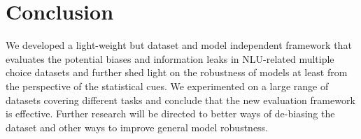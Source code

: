 \section{Conclusion}
We developed a light-weight but dataset and model independent framework that evaluates the
potential biases and information leaks in NLU-related multiple choice datasets and further shed light on
the robustness of models at least from the perspective of the statistical cues. 
We experimented on a large range of datasets covering different tasks and conclude that
the new evaluation framework is effective.
 Further research will be
directed to better ways of de-biasing the dataset and other ways to improve general model 
robustness.
